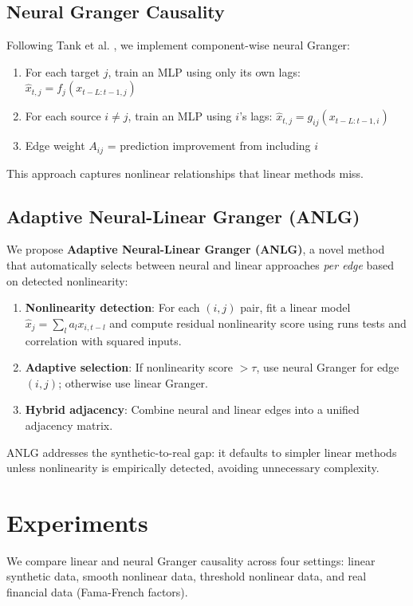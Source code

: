 \documentclass[sigconf,nonacm]{acmart}
\begin{document}
\subsection{Neural Granger Causality}
Following Tank et al. \cite{tank2021neural}, we implement component-wise neural Granger:
\begin{enumerate}
    \item For each target $j$, train an MLP using only its own lags: $\hat{x}_{t,j} = f_j(x_{t-L:t-1,j})$
    \item For each source $i \neq j$, train an MLP using $i$'s lags: $\hat{x}_{t,j} = g_{ij}(x_{t-L:t-1,i})$
    \item Edge weight $A_{ij}$ = prediction improvement from including $i$
\end{enumerate}
This approach captures nonlinear relationships that linear methods miss.

\subsection{Adaptive Neural-Linear Granger (ANLG)}
We propose \textbf{Adaptive Neural-Linear Granger (ANLG)}, a novel method that automatically selects between neural and linear approaches \textit{per edge} based on detected nonlinearity:

\begin{enumerate}
    \item \textbf{Nonlinearity detection}: For each $(i,j)$ pair, fit a linear model $\hat{x}_j = \sum_l a_l x_{i,t-l}$ and compute residual nonlinearity score using runs tests and correlation with squared inputs.
    \item \textbf{Adaptive selection}: If nonlinearity score $> \tau$, use neural Granger for edge $(i,j)$; otherwise use linear Granger.
    \item \textbf{Hybrid adjacency}: Combine neural and linear edges into a unified adjacency matrix.
\end{enumerate}

ANLG addresses the synthetic-to-real gap: it defaults to simpler linear methods unless nonlinearity is empirically detected, avoiding unnecessary complexity.

\section{Experiments}

We compare linear and neural Granger causality across four settings: linear synthetic data, smooth nonlinear data, threshold nonlinear data, and real financial data (Fama-French factors).
\end{document}
